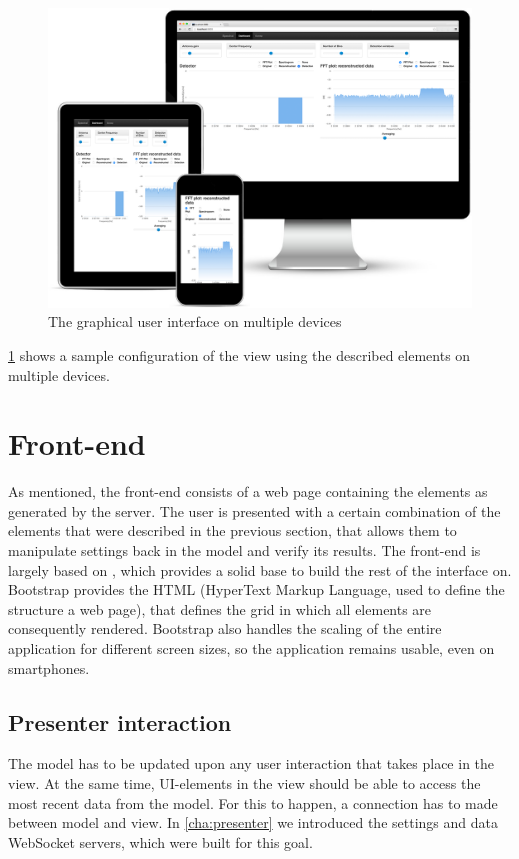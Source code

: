\documentclass[a4paper, openany, oneside]{memoir}
\begin{document}
\begin{figure}[H]
    \centering
    \includegraphics[width=\textwidth]{figures/multidevice.png}
    \caption{The graphical user interface on multiple devices}
    \label{fig:multidevice}
\end{figure}

\cref{fig:multidevice} shows a sample configuration of the view using the described elements on multiple devices.

\section{Front-end}
\label{sec:clientside}
As mentioned, the front-end consists of a web page containing the elements as generated by the server. The user is presented with a certain combination of the elements that were described in the previous section, that allows them to manipulate settings back in the model and verify its results. The front-end is largely based on , which provides a solid base to build the rest of the interface on. Bootstrap provides the HTML (HyperText Markup Language, used to define the structure a web page), that defines the grid in which all elements are consequently rendered. Bootstrap also handles the scaling of the entire application for different screen sizes, so the application remains usable, even on smartphones.

\subsection{Presenter interaction}
\label{sub:presenter_interaction}
The model has to be updated upon any user interaction that takes place in the view. At the same time, UI-elements in the view should be able to access the most recent data from the model. For this to happen, a connection has to made between model and view. In \cref{cha:presenter} we introduced the settings and data WebSocket servers, which were built for this goal.
\end{document}
